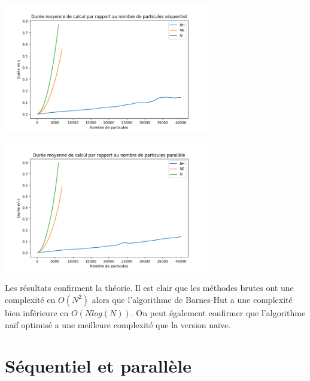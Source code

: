 \begin{minipage}[c]{.46\linewidth}
     \begin{center}
             \includegraphics[width=9cm]{./resultats/method_comparison_seq.png}
         \end{center}
   \end{minipage} \hfill
   \begin{minipage}[c]{.46\linewidth}
    \begin{center}
            \includegraphics[width=9cm]{./resultats/method_comparison_par.png}
        \end{center}
 \end{minipage}
 
Les résultats confirment la théorie. Il est clair que les méthodes brutes ont une complexité en $O(N^2)$ alors que l'algorithme de Barnes-Hut a une complexité bien inférieure en $O(Nlog(N))$.
On peut également confirmer que l'algorithme naïf optimisé a une meilleure complexité que la version naïve.
 
\section{Séquentiel et parallèle}


